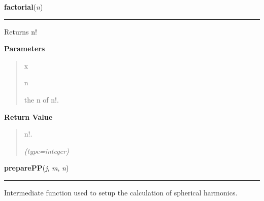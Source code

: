 \hspace{.8\funcindent}\begin{boxedminipage}{\funcwidth}

    \raggedright \textbf{factorial}(\textit{n})

    \vspace{-1.5ex}

    \rule{\textwidth}{0.5\fboxrule}
\setlength{\parskip}{2ex}
    Returns n!

\setlength{\parskip}{1ex}
      \textbf{Parameters}
      \vspace{-1ex}

      \begin{quote}
        \begin{Ventry}{x}

          \item[n]

          the n of n!.

        \end{Ventry}

      \end{quote}

      \textbf{Return Value}
    \vspace{-1ex}

      \begin{quote}
      n!.

      {\it (type=integer)}

      \end{quote}

    \end{boxedminipage}

    \label{nMOLDYN:Core:Mathematics:preparePP}

    \vspace{0.5ex}

\hspace{.8\funcindent}\begin{boxedminipage}{\funcwidth}

    \raggedright \textbf{preparePP}(\textit{j}, \textit{m}, \textit{n})

    \vspace{-1.5ex}

    \rule{\textwidth}{0.5\fboxrule}
\setlength{\parskip}{2ex}
    Intermediate function used to setup the calculation of spherical 
    harmonics.

\setlength{\parskip}{1ex}
    \end{boxedminipage}

